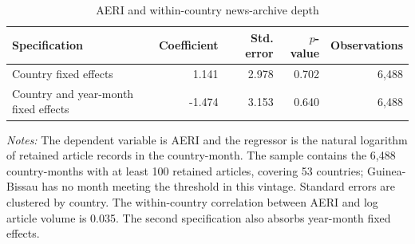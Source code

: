 \begin{table}[htbp]\centering
\caption{AERI and within-country news-archive depth}\label{tab:archive_depth}
\begin{singlespace}\small
\begin{tabular}{lrrrr}
\toprule
Specification & Coefficient & Std. error & $p$-value & Observations\\
\midrule
Country fixed effects & 1.141 & 2.978 & 0.702 & 6,488\\
Country and year-month fixed effects & -1.474 & 3.153 & 0.640 & 6,488\\
\bottomrule
\end{tabular}
\vspace{2mm}
\parbox{0.92\textwidth}{\footnotesize\textit{Notes:} The dependent variable is AERI and the regressor is the natural logarithm of retained article records in the country-month. The sample contains the 6,488 country-months with at least 100 retained articles, covering 53 countries; Guinea-Bissau has no month meeting the threshold in this vintage. Standard errors are clustered by country. The within-country correlation between AERI and log article volume is 0.035. The second specification also absorbs year-month fixed effects.}
\end{singlespace}
\end{table}
